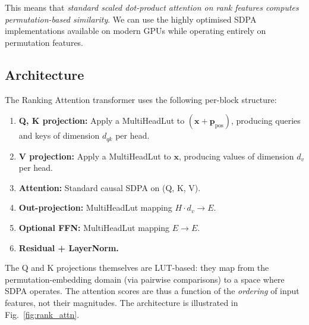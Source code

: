 \documentclass[11pt]{article}
\begin{document}
This means that \emph{standard scaled dot-product attention on rank features computes permutation-based similarity}.
We can use the highly optimised SDPA implementations available on modern GPUs while operating entirely on permutation features.

\subsection{Architecture}

The Ranking Attention transformer uses the following per-block structure:
\begin{enumerate}
    \item \textbf{Q, K projection:} Apply a MultiHeadLut to $(\mathbf{x} + \mathbf{p}_\mathrm{pos})$, producing queries and keys of dimension $d_{qk}$ per head.
    \item \textbf{V projection:} Apply a MultiHeadLut to $\mathbf{x}$, producing values of dimension $d_v$ per head.
    \item \textbf{Attention:} Standard causal SDPA on (Q, K, V).
    \item \textbf{Out-projection:} MultiHeadLut mapping $H \cdot d_v \to E$.
    \item \textbf{Optional FFN:} MultiHeadLut mapping $E \to E$.
    \item \textbf{Residual + LayerNorm.}
\end{enumerate}

The Q and K projections themselves are LUT-based: they map from the permutation-embedding domain (via pairwise comparisons) to a space where SDPA operates.
The attention scores are thus a function of the \emph{ordering} of input features, not their magnitudes.
The architecture is illustrated in Fig.~\ref{fig:rank_attn}.
\end{document}
